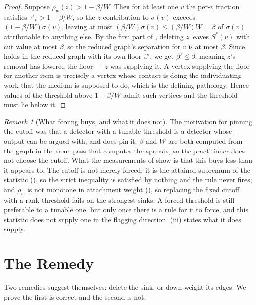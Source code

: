 \documentclass[11pt,a4paper]{article}
\theoremstyle{definition}
\theoremstyle{remark}
\newtheorem{remark}[theorem]{Remark}
\newcommand{\wt}{w}
\newcommand{\flo}{\beta}
\newcommand{\sep}{\sigma}
\newcommand{\spr}{\rho}                       %
\begin{document}
\begin{proof}
Suppose $\spr_{\wt}(z) > 1 - \flo/W$. Then for at least one $v$ the
per-$v$ fraction satisfies $\tau'_v > 1 - \flo/W$, so the $z$-contribution
to $\sep(v)$ exceeds $(1-\flo/W)\sep(v)$, leaving at most
$(\flo/W)\sep(v) \leq (\flo/W)W = \flo$ of $\sep(v)$ attributable to
anything else. By the first part of , deleting
$z$ leaves $S^{\ast}(v)$ with cut value at most $\flo$, so the reduced
graph's separation for $v$ is at most $\flo$. Since 
holds in the reduced graph with its own floor $\flo'$, we get
$\flo' \leq \flo$, meaning $z$'s removal has lowered the floor --- $z$
was supplying it. A vertex supplying the floor for another item is
precisely a vertex whose contact is doing the individuating work that the
medium is supposed to do, which is the defining pathology. Hence values
of the threshold above $1-\flo/W$ admit such vertices and the threshold
must lie below it.
\end{proof}

\begin{remark}[What forcing buys, and what it does not]\label{rem:forced}
The motivation for pinning the cutoff was that a detector with a tunable
threshold is a detector whose output can be argued with, and
 does pin it: $\flo$ and $W$ are both computed from
the graph in the same pass that computes the spreads, so the
practitioner does not choose the cutoff. What the measurements of
 show is that this buys less than it appears to.
The cutoff is not merely forced, it is the attained supremum of the
statistic (), so the strict inequality is
satisfied by nothing and the rule never fires; and $\spr_{\wt}$ is not
monotone in attachment weight (), so replacing the
fixed cutoff with a rank threshold fails on the strongest sinks. A
forced threshold is still preferable to a tunable one, but only once
there is a rule for it to force, and this statistic does not supply one
in the flagging direction. (iii) states what it does
supply.
\end{remark}

\section{The Remedy}
\label{sec:remedy}

Two remedies suggest themselves: delete the sink, or down-weight its
edges. We prove the first is correct and the second is not.
\end{document}
